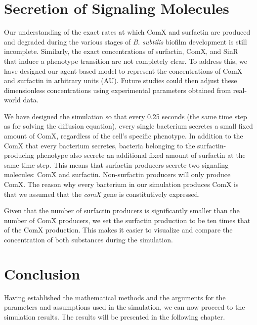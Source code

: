   \section{Secretion of Signaling Molecules}\label{sec:contrib2:theme2}
  Our understanding of the exact rates at which ComX and surfactin are produced and degraded during the various stages of \textit{B. subtilis} biofilm development is still incomplete. Similarly, the exact concentrations of surfactin, ComX, and SinR that induce a phenotype transition are not completely clear. To address this, we have designed our agent-based model to represent the concentrations of ComX and surfactin in arbitrary units (AU). Future studies could then adjust these dimensionless concentrations using experimental parameters obtained from real-world data.
  
  We have designed the simulation so that every 0.25 seconds (the same time step as for solving the diffusion equation), every single bacterium secretes a small fixed amount of ComX, regardless of the cell's specific phenotype. In addition to the ComX that every bacterium secretes, bacteria belonging to the surfactin-producing phenotype also secrete an additional fixed amount of surfactin at the same time step. This means that surfactin producers secrete two signaling molecules: ComX and surfactin. Non-surfactin producers will only produce ComX. The reason why every bacterium in our simulation produces ComX is that we assumed that the \textit{comX} gene is constitutively expressed.

  Given that the number of surfactin producers is significantly smaller than the number of ComX producers, we set the surfactin production to be ten times that of the ComX production. This makes it easier to visualize and compare the concentration of both substances during the simulation.

  \section{Conclusion}

  Having established the mathematical methods and the arguments for the parameters and assumptions used in the simulation, we can now proceed to the simulation results. The results will be presented in the following chapter.
    
  
  

